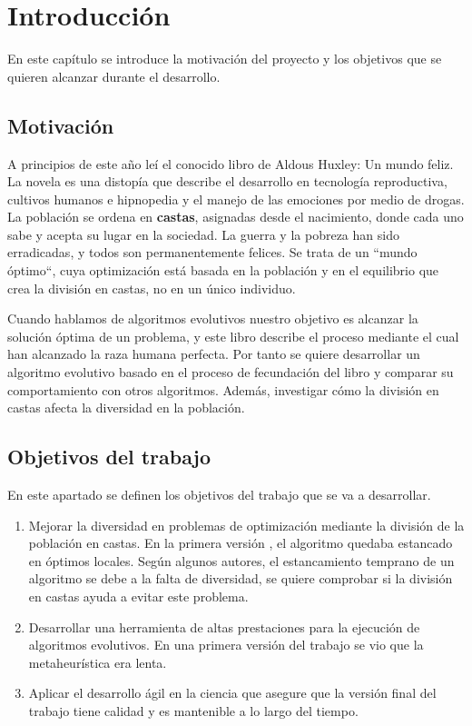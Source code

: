 \chapter{Introducción}

En este capítulo se introduce la motivación del proyecto y los objetivos que se quieren alcanzar durante el desarrollo. 

\section{Motivación}

A principios de este año leí el conocido libro de Aldous Huxley: Un mundo feliz. La novela es una
distopía que describe el desarrollo en tecnología reproductiva, cultivos humanos e hipnopedia y el manejo de las
emociones por medio de drogas. La población se ordena en \textbf{castas}, asignadas desde el nacimiento, donde cada uno
sabe y acepta su lugar en la sociedad. La guerra y la pobreza han sido erradicadas, y todos son permanentemente
felices. Se trata de un ``mundo óptimo``, cuya optimización está basada en la población y en el equilibrio que crea
la división en castas, no en un único individuo.

Cuando hablamos de algoritmos evolutivos nuestro objetivo es alcanzar la solución óptima de un problema, y este libro describe el 
proceso mediante el cual han alcanzado la raza humana perfecta. Por tanto se quiere desarrollar un algoritmo evolutivo basado en 
el proceso de fecundación del libro y comparar su comportamiento con otros algoritmos. Además, investigar cómo la división en castas afecta
la diversidad en la población.

\section{Objetivos del trabajo} \label{sect:goals}

En este apartado se definen los objetivos del trabajo que se va a desarrollar.
\begin{enumerate}
    \item Mejorar la diversidad en problemas de optimización mediante la división de la población en castas. En
    la primera versión \cite{merelo_molina_2021}, el algoritmo quedaba estancado en óptimos locales. Según
    algunos autores, el estancamiento temprano de un algoritmo se debe a la falta de diversidad, se quiere comprobar
    si la división en castas ayuda a evitar este problema.
    \item Desarrollar una herramienta de altas prestaciones para la ejecución de algoritmos evolutivos. En una 
    primera versión del trabajo \cite{merelo_molina_2021} se vio que la metaheurística era lenta.
    \item Aplicar el desarrollo ágil en la ciencia \cite{DBLP} que asegure que la versión final del trabajo tiene calidad y
    es mantenible a lo largo del tiempo.
\end{enumerate}

